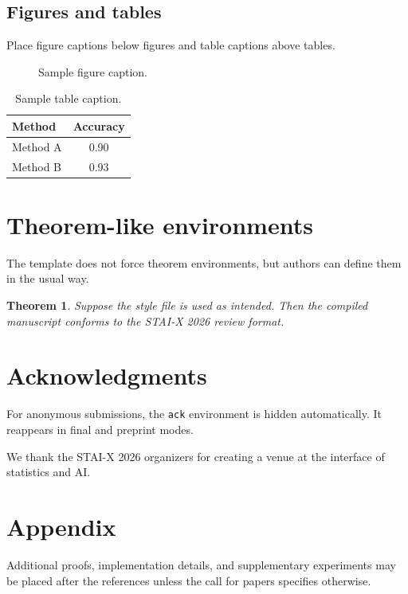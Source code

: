 \documentclass{article}
\begin{document}
\subsection{Figures and tables}
Place figure captions below figures and table captions above tables.

\begin{figure}[h]
\centering
\fbox{\rule[-.5cm]{0cm}{4cm} \rule[-.5cm]{4cm}{0cm}}
\caption{Sample figure caption.}
\label{fig:sample}
\end{figure}

\begin{table}[h]
\caption{Sample table caption.}
\label{tab:sample}
\centering
\begin{tabular}{lc}
\toprule
Method & Accuracy \\
\midrule
Method A & 0.90 \\
Method B & 0.93 \\
\bottomrule
\end{tabular}
\end{table}

\section{Theorem-like environments}
The template does not force theorem environments, but authors can define them in the usual way.

\newtheorem{theorem}{Theorem}
\begin{theorem}
Suppose the style file is used as intended. Then the compiled manuscript conforms to the STAI-X 2026 review format.
\end{theorem}

\section{Acknowledgments}
For anonymous submissions, the \texttt{ack} environment is hidden automatically. It reappears in final and preprint modes.

\begin{ack}
We thank the STAI-X 2026 organizers for creating a venue at the interface of statistics and AI.
\end{ack}




\appendix
\section{Appendix}
Additional proofs, implementation details, and supplementary experiments may be placed after the references unless the call for papers specifies otherwise.
\end{document}
